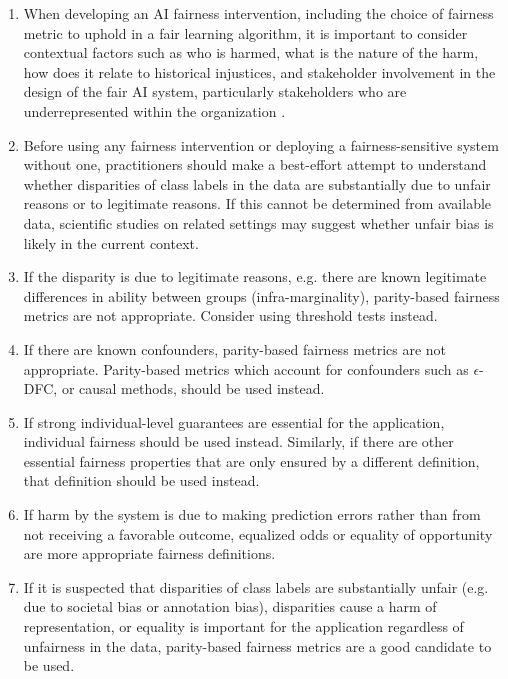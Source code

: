 \documentclass[11pt,dvipdfm]{article}
\begin{document}
\begin{enumerate}

 \item When developing an AI fairness intervention, including the choice of fairness metric to uphold in a fair learning algorithm, it is important to consider contextual factors such as who is harmed, what is the nature of the harm, how does it relate to historical injustices, and stakeholder involvement in the design of the fair AI system, particularly stakeholders who are underrepresented within the organization \cite{crawford2019ai}.
 
 \item Before using any fairness intervention or deploying a fairness-sensitive system without one, practitioners should make a best-effort attempt to understand whether disparities of class labels in the data are substantially due to unfair reasons or to legitimate reasons.  If this cannot be determined from available data, scientific studies on related settings may suggest whether unfair bias is likely in the current context.
 
 \item If the disparity is due to legitimate reasons, e.g. there are known legitimate differences in ability between groups (infra-marginality), parity-based fairness metrics are not appropriate.  Consider using threshold tests instead. 

 \item If there are known confounders, parity-based fairness metrics are not appropriate.  Parity-based metrics which account for confounders such as $\epsilon$-DFC, or causal methods, should be used instead.
 
 \item If strong individual-level guarantees are essential for the application, individual fairness should be used instead.  Similarly, if there are other essential fairness properties that are only ensured by a different definition, that definition should be used instead. 

 \item If harm by the system is due to making prediction errors rather than from not receiving a favorable outcome, equalized odds or equality of opportunity are more appropriate fairness definitions.
 
 \item If it is suspected that disparities of class labels are substantially unfair (e.g. due to societal bias or annotation bias), disparities cause a harm of representation, or equality is important for the application regardless of unfairness in the data, parity-based fairness metrics are a good candidate to be used.
 

\end{enumerate}
\end{document}
